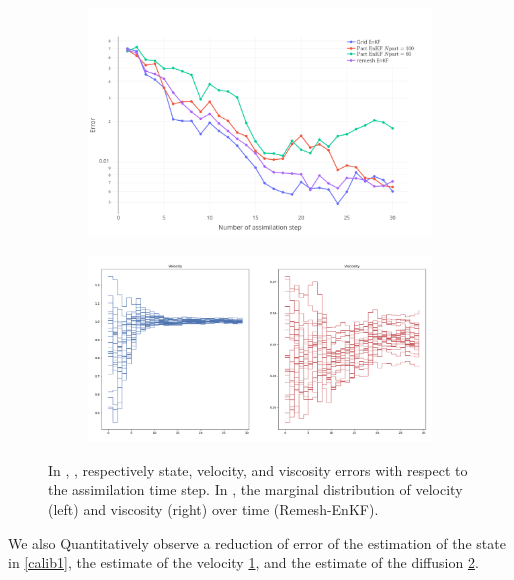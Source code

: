 \begin{figure}[ht]
\begin{subfigure}{0.49\textwidth}
		\caption{}
		\label{calib2}
	\end{subfigure}
	\vfill
	\begin{subfigure}{0.49\textwidth}
		\includegraphics[width=\textwidth]{images/app1d/w_calibration/viscosity_error.png}
		\caption{}
		\label{calib3}
	\end{subfigure}
	\hfill
	\begin{subfigure}{0.49\textwidth}
		\includegraphics[width=\textwidth]{images/app1d/w_calibration/remesh EnKF_params.png}
		\caption{}
		\label{calib4}
	\end{subfigure}
	\caption{In , ,  respectively state, velocity, and viscosity errors with respect to the assimilation time step. In , the marginal distribution of velocity (left) and viscosity (right) over time (Remesh-EnKF).}
\end{figure}

We also Quantitatively observe a reduction of error of the estimation of the state in \ref{calib1}, the estimate of the velocity \ref{calib2}, and the estimate of the diffusion \ref{calib3}.

